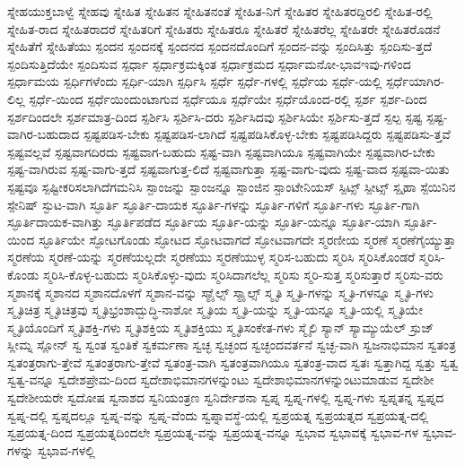 {ಸ್ನೇಹಯುಕ್ತಬಾಳ್ವೆ
ಸ್ನೇಹವು
ಸ್ನೇಹಿತ
ಸ್ನೇಹಿತನ
ಸ್ನೇಹಿತನಂತೆ
ಸ್ನೇಹಿತ-ನಿಗೆ
ಸ್ನೇಹಿತರ
ಸ್ನೇಹಿತರದ್ದಿರಲಿ
ಸ್ನೇಹಿತ-ರಲ್ಲಿ
ಸ್ನೇಹಿತ-ರಾದ
ಸ್ನೇಹಿತರಾದರೆ
ಸ್ನೇಹಿತರಿಗೆ
ಸ್ನೇಹಿತರು
ಸ್ನೇಹಿತರೂ
ಸ್ನೇಹಿತರೆ
ಸ್ನೇಹಿತರೆಲ್ಲ
ಸ್ನೇಹಿತರೇ
ಸ್ನೇಹಿತರೊಡನೆ
ಸ್ನೇಹಿತೆಗೆ
ಸ್ನೇಹಿತೆಯು
ಸ್ಪಂದನ
ಸ್ಪಂದನಕ್ಕೆ
ಸ್ಪಂದನದ
ಸ್ಪಂದನದೊಂದಿಗೆ
ಸ್ಪಂದನ-ವನ್ನು
ಸ್ಪಂದಿಸಿತ್ತು
ಸ್ಪಂದಿಸು-ತ್ತದೆ
ಸ್ಪಂದಿಸುತ್ತಿದೆಯೇ
ಸ್ಪಂದಿಸುವ
ಸ್ಪರ್ಧಾ
ಸ್ಪರ್ಧಾಕ್ರಮಕ್ಕಿಂತ
ಸ್ಪರ್ಧಾಕ್ರಮದ
ಸ್ಪರ್ಧಾಮನೋ-ಭಾವಇವು-ಗಳಿಂದ
ಸ್ಪರ್ಧಾಮಯ
ಸ್ಪರ್ಧಿಗಳೆಂದು
ಸ್ಪರ್ಧಿ-ಯಾಗಿ
ಸ್ಪರ್ಧಿಸಿ
ಸ್ಪರ್ಧೆ
ಸ್ಪರ್ಧೆ-ಗಳಲ್ಲಿ
ಸ್ಪರ್ಧೆಯ
ಸ್ಪರ್ಧೆ-ಯಲ್ಲಿ
ಸ್ಪರ್ಧೆಯಾಗಿರ-ಲಿಲ್ಲ
ಸ್ಪರ್ಧೆ-ಯಿಂದ
ಸ್ಪರ್ಧೆಯಿಂದುಂಟಾಗುವ
ಸ್ಪರ್ಧೆಯೂ
ಸ್ಪರ್ಧೆಯೇ
ಸ್ಪರ್ಧೆಯೊಂದ-ರಲ್ಲಿ
ಸ್ಪರ್ಶ
ಸ್ಪರ್ಶ-ದಿಂದ
ಸ್ಪರ್ಶದಿಂದಲೇ
ಸ್ಪರ್ಶಮಾತ್ರ-ದಿಂದ
ಸ್ಪರ್ಶಿಸಿ
ಸ್ಪರ್ಶಿಸಿ-ದರು
ಸ್ಪರ್ಶಿಸಿದವು
ಸ್ಪರ್ಶಿಸಿಯೇ
ಸ್ಪರ್ಶಿಸು-ತ್ತದೆ
ಸ್ಪಲ್ಪ
ಸ್ಪಷ್ಟ
ಸ್ಪಷ್ಟ-ವಾಗಿರ-ಬಹುದಾದ
ಸ್ಪಷ್ಟಪಡಿಸ-ಬೇಕು
ಸ್ಪಷ್ಟಪಡಿಸ-ಲಾಗಿದೆ
ಸ್ಪಷ್ಟಪಡಿಸಿಕೊಳ್ಳ-ಬೇಕು
ಸ್ಪಷ್ಟಪಡಿಸಿದ್ದರು
ಸ್ಪಷ್ಟಪಡಿಸು-ತ್ತವೆ
ಸ್ಪಷ್ಟವಲ್ಲವೆ
ಸ್ಪಷ್ಟವಾಗದಿರದು
ಸ್ಪಷ್ಟವಾಗ-ಬಹುದು
ಸ್ಪಷ್ಟ-ವಾಗಿ
ಸ್ಪಷ್ಟವಾಗಿಯೂ
ಸ್ಪಷ್ಟವಾಗಿಯೇ
ಸ್ಪಷ್ಟವಾಗಿರ-ಬೇಕು
ಸ್ಪಷ್ಟ-ವಾಗಿರುವ
ಸ್ಪಷ್ಟ-ವಾಗು-ತ್ತದೆ
ಸ್ಪಷ್ಟವಾಗುತ್ತ-ಲಿದೆ
ಸ್ಪಷ್ಟವಾಗುತ್ತಾ
ಸ್ಪಷ್ಟ-ವಾಗು-ವುದು
ಸ್ಪಷ್ಟ-ವಾದ
ಸ್ಪಷ್ಟವಾ-ಯಿತು
ಸ್ಪಷ್ಟವೂ
ಸ್ಪಷ್ಟೀಕರಿಸಲಾಗಿದೆಗಮನಿಸಿ
ಸ್ಪಾಂಜನ್ನು
ಸ್ಪಾಂಜನ್ನೂ
ಸ್ಪಾಂಜಿನ
ಸ್ಪಾಂಟೇನಿಯಸ್
ಸ್ಪಿಟ್ಸ್
ಸ್ಪೀಟ್ಸ್
ಸ್ಪೃಹಾ
ಸ್ಪೆಯಿನಿನ
ಸ್ಪೇನಿಷ್
ಸ್ಫುಟ-ವಾಗಿ
ಸ್ಫೂರ್ತಿ
ಸ್ಫೂರ್ತಿ-ದಾಯಕ
ಸ್ಫೂರ್ತಿ-ಗಳನ್ನು
ಸ್ಫೂರ್ತಿ-ಗಳಿಗೆ
ಸ್ಫೂರ್ತಿ-ಗಳು
ಸ್ಫೂರ್ತಿ-ಗಾಗಿ
ಸ್ಫೂರ್ತಿದಾಯಕ-ವಾಗಿತ್ತು
ಸ್ಫೂರ್ತಿಪಡೆದ
ಸ್ಫೂರ್ತಿಯ
ಸ್ಫೂರ್ತಿ-ಯನ್ನು
ಸ್ಫೂರ್ತಿ-ಯನ್ನೂ
ಸ್ಫೂರ್ತಿ-ಯಾಗಿ
ಸ್ಫೂರ್ತಿ-ಯಿಂದ
ಸ್ಫೂರ್ತಿಯೇ
ಸ್ಫೋಟಗೊಂಡು
ಸ್ಫೋಟದ
ಸ್ಫೋಟವಾಗದೆ
ಸ್ಫೋಟವಾಗದೇ
ಸ್ಮರಣೀಯ
ಸ್ಮರಣೆ
ಸ್ಮರಣೆಗೈಯ್ಯುತ್ತಾ
ಸ್ಮರಣೆಯ
ಸ್ಮರಣೆ-ಯನ್ನು
ಸ್ಮರಣೆಯಲ್ಲದೇ
ಸ್ಮರಣೆಯು
ಸ್ಮರಣೆಯುಳ್ಳ
ಸ್ಮರಿಸ-ಬಹುದು
ಸ್ಮರಿಸಿ
ಸ್ಮರಿಸಿಕೊಂಡರೆ
ಸ್ಮರಿಸಿ-ಕೊಂಡು
ಸ್ಮರಿಸಿ-ಕೊಳ್ಳ-ಬಹುದು
ಸ್ಮರಿಸಿಕೊಳ್ಳು-ವುದು
ಸ್ಮರಿಸಿದಾಗಲೆಲ್ಲ
ಸ್ಮರಿಸು
ಸ್ಮರಿ-ಸುತ್ತ
ಸ್ಮರಿಸುತ್ತಾರೆ
ಸ್ಮರಿಸು-ವರು
ಸ್ಮಶಾನಕ್ಕೆ
ಸ್ಮಶಾನದ
ಸ್ಮಶಾನದೊಳಗೆ
ಸ್ಮಶಾನ-ವನ್ನು
ಸ್ಮಾೈಲ್ಸ್
ಸ್ಮಾೖಲ್ಸ್
ಸ್ಮೃತಿ
ಸ್ಮೃತಿ-ಗಳನ್ನು
ಸ್ಮೃತಿ-ಗಳನ್ನೂ
ಸ್ಮೃತಿ-ಗಳು
ಸ್ಮೃತಿಚಿತ್ರ
ಸ್ಮೃತಿಚಿತ್ರವು
ಸ್ಮೃತಿಭ್ರಂಶಾದ್ಬುದ್ಧಿ-ನಾಶೋ
ಸ್ಮೃತಿಯ
ಸ್ಮೃತಿ-ಯನ್ನು
ಸ್ಮೃತಿ-ಯನ್ನೂ
ಸ್ಮೃತಿ-ಯಲ್ಲಿ
ಸ್ಮೃತಿಯೇ
ಸ್ಮೃತಿಯೊಂದಿಗೆ
ಸ್ಮೃತಿಶಕ್ತಿ-ಗಳು
ಸ್ಮೃತಿಶಕ್ತಿಯ
ಸ್ಮೃತಿಶಕ್ತಿಯು
ಸ್ಮೃತಿಸಂಕೇತ-ಗಳು
ಸ್ಮೈಲಿ
ಸ್ಯಾನ್
ಸ್ಯಾಮ್ಯುಯೆಲ್
ಸ್ರುಜ್
ಸ್ಲೀಮ್ನ
ಸ್ಲೋನ್
ಸ್ವ
ಸ್ವಂತ
ಸ್ವಂತಿಕೆ
ಸ್ವಕರ್ಮಣಾ
ಸ್ವಚ್ಛ
ಸ್ವಚ್ಛಂದ
ಸ್ವಚ್ಛಂದವರ್ತನೆ
ಸ್ವಚ್ಛ-ವಾಗಿ
ಸ್ವಜನಾಭಿಮಾನ
ಸ್ವತಂತ್ರ
ಸ್ವತಂತ್ರರಾಗು-ತ್ತೇವೆ
ಸ್ವತಂತ್ರರಾಗು-ತ್ತೇವೆ
ಸ್ವತಂತ್ರ-ವಾಗಿ
ಸ್ವತಂತ್ರವಾಗಿಯೂ
ಸ್ವತಂತ್ರ-ವಾದ
ಸ್ವತಃ
ಸ್ವತ್ತಾಗಿದ್ದ
ಸ್ವತ್ತು
ಸ್ವತ್ವ
ಸ್ವತ್ವ-ವನ್ನೂ
ಸ್ವದೇಶಪ್ರೇಮ-ದಿಂದ
ಸ್ವದೇಶಾಭಿಮಾನಗಳನ್ನುಂಟು
ಸ್ವದೇಶಾಭಿಮಾನಗಳನ್ನುಂಟುಮಾಡುವ
ಸ್ವದೇಶೀ
ಸ್ವದೇಶೀಯರೇ
ಸ್ವದೋಷ
ಸ್ವನಾಶದ
ಸ್ವನಿಯಂತ್ರಣ
ಸ್ವನಿರ್ದೇಶನಾ
ಸ್ವಪ್ನ
ಸ್ವಪ್ನ-ಗಳಲ್ಲಿ
ಸ್ವಪ್ನ-ಗಳು
ಸ್ವಪ್ನತನ್ನ
ಸ್ವಪ್ನದ
ಸ್ವಪ್ನ-ದಲ್ಲಿ
ಸ್ವಪ್ನದಲ್ಲೂ
ಸ್ವಪ್ನ-ವನ್ನು
ಸ್ವಪ್ನ-ವೆಂದು
ಸ್ವಪ್ನಾವಸ್ಥೆ-ಯಲ್ಲಿ
ಸ್ವಪ್ರಯತ್ನ
ಸ್ವಪ್ರಯತ್ನದ
ಸ್ವಪ್ರಯತ್ನ-ದಲ್ಲಿ
ಸ್ವಪ್ರಯತ್ನ-ದಿಂದ
ಸ್ವಪ್ರಯತ್ನದಿಂದಲೇ
ಸ್ವಪ್ರಯತ್ನ-ವನ್ನು
ಸ್ವಪ್ರಯತ್ನ-ವನ್ನೂ
ಸ್ವಭಾವ
ಸ್ವಭಾವಕ್ಕೆ
ಸ್ವಭಾವ-ಗಳ
ಸ್ವಭಾವ-ಗಳನ್ನು
ಸ್ವಭಾವ-ಗಳಲ್ಲಿ
}
